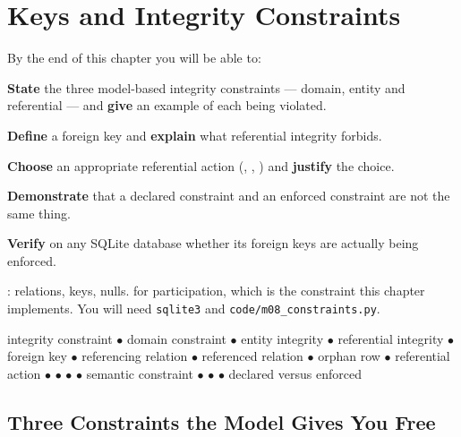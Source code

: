 \chapter{Keys and Integrity Constraints}\label{ch:constraints}

\begin{outcomes}
By the end of this chapter you will be able to:
\begin{tight}
  \item \textbf{State} the three model-based integrity constraints --- domain,
        entity and referential --- and \textbf{give} an example of each being
        violated.
  \item \textbf{Define} a foreign key and \textbf{explain} what referential
        integrity forbids.
  \item \textbf{Choose} an appropriate referential action (,
        , ) and \textbf{justify} the choice.
  \item \textbf{Demonstrate} that a declared constraint and an enforced
        constraint are not the same thing.
  \item \textbf{Verify} on any SQLite database whether its foreign keys are
        actually being enforced.
\end{tight}
\end{outcomes}

\begin{prereq}
: relations, keys, nulls.  for
participation, which is the constraint this chapter implements. You will need
\texttt{sqlite3} and \texttt{code/m08\_constraints.py}.
\end{prereq}

\begin{keyterms}
integrity constraint $\bullet$ domain constraint $\bullet$ entity integrity
$\bullet$ referential integrity $\bullet$ foreign key $\bullet$ referencing
relation $\bullet$ referenced relation $\bullet$ orphan row $\bullet$
referential action $\bullet$  $\bullet$ 
$\bullet$  $\bullet$ semantic constraint $\bullet$
 $\bullet$  $\bullet$ declared versus enforced
\end{keyterms}

\section{Three Constraints the Model Gives You Free}

